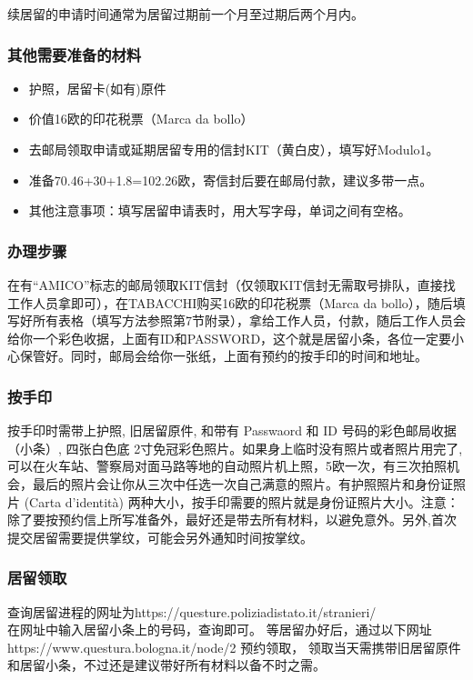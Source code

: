 续居留的申请时间通常为居留过期前一个月至过期后两个月内。 

\subsubsection{其他需要准备的材料}
\begin{itemize} 
\item 护照，居留卡(如有)原件
\item 价值16欧的印花税票（Marca da bollo）
\item 去邮局领取申请或延期居留专用的信封KIT（黄白皮），填写好Modulo1。
\item 准备70.46+30+1.8=102.26欧，寄信封后要在邮局付款，建议多带一点。
\item 其他注意事项：填写居留申请表时，用大写字母，单词之间有空格。
\end{itemize}


\subsubsection{办理步骤}
在有“AMICO”标志的邮局领取KIT信封（仅领取KIT信封无需取号排队，直接找工作人员拿即可），在TABACCHI购买16欧的印花税票（Marca da bollo），随后填写好所有表格（填写方法参照第7节附录），拿给工作人员，付款，随后工作人员会给你一个彩色收据，上面有ID和PASSWORD，这个就是居留小条，各位一定要小心保管好。同时，邮局会给你一张纸，上面有预约的按手印的时间和地址。


\subsubsection{按手印}
按手印时需带上护照, 旧居留原件, 和带有 Passwaord 和 ID 号码的彩色邮局收据（小条）, 四张白色底 2寸免冠彩色照片。如果身上临时没有照片或者照片用完了,可以在火车站、警察局对面马路等地的自动照片机上照，5欧一次，有三次拍照机会，最后的照片会让你从三次中任选一次自己满意的照片。有护照照片和身份证照片 (Carta d'identità)  两种大小，按手印需要的照片就是身份证照片大小。注意：除了要按预约信上所写准备外，最好还是带去所有材料，以避免意外。另外,首次提交居留需要提供掌纹，可能会另外通知时间按掌纹。


\subsubsection{居留领取}
查询居留进程的网址为https://questure.poliziadistato.it/stranieri/\\
在网址中输入居留小条上的号码，查询即可。
等居留办好后，通过以下网址https://www.questura.bologna.it/node/2 预约领取，
领取当天需携带旧居留原件和居留小条，不过还是建议带好所有材料以备不时之需。


